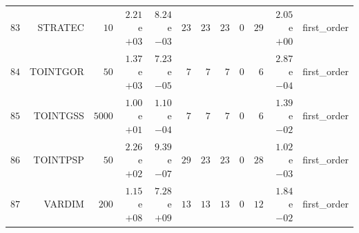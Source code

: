 \begin{longtable}{rrrrrrrrrrrr}
  \(    83\) & STRATEC & \(    10\) & \( 2.21\)e\(+03\) & \( 8.24\)e\(-03\) & \(    23\) & \(    23\) & \(    23\) & \(     0\) & \(    29\) & \( 2.05\)e\(+00\) & first\_order \\
  \(    84\) & TOINTGOR & \(    50\) & \( 1.37\)e\(+03\) & \( 7.23\)e\(-05\) & \(     7\) & \(     7\) & \(     7\) & \(     0\) & \(     6\) & \( 2.87\)e\(-04\) & first\_order \\
  \(    85\) & TOINTGSS & \(  5000\) & \( 1.00\)e\(+01\) & \( 1.10\)e\(-04\) & \(     7\) & \(     7\) & \(     7\) & \(     0\) & \(     6\) & \( 1.39\)e\(-02\) & first\_order \\
  \(    86\) & TOINTPSP & \(    50\) & \( 2.26\)e\(+02\) & \( 9.39\)e\(-07\) & \(    29\) & \(    23\) & \(    23\) & \(     0\) & \(    28\) & \( 1.02\)e\(-03\) & first\_order \\
  \(    87\) & VARDIM & \(   200\) & \( 1.15\)e\(+08\) & \( 7.28\)e\(+09\) & \(    13\) & \(    13\) & \(    13\) & \(     0\) & \(    12\) & \( 1.84\)e\(-02\) & first\_order \\\hline
\end{longtable}
